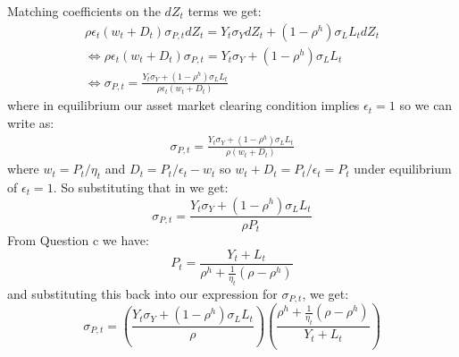 \documentclass{article}
\begin{document}
    Matching coefficients on the $dZ_t$ terms we get:
    \[
    \begin{aligned}
        \rho \epsilon_t (w_t + D_t) \sigma_{P, t} d Z_t = Y_t \sigma_Y d Z_t + (1 - \rho^h) \sigma_L L_t d Z_t\\
        \iff \rho \epsilon_t (w_t + D_t) \sigma_{P, t}  = Y_t \sigma_Y + (1 - \rho^h) \sigma_L L_t \\
        \iff \sigma_{P, t} = \frac{Y_t \sigma_Y + (1 - \rho^h) \sigma_L L_t}{\rho \epsilon_t (w_t + D_t)}
    \end{aligned}    
    \]
    where in equilibrium our asset market clearing condition implies $\epsilon_t = 1$ so we can write as:
    \[
        \begin{aligned}
            \sigma_{P, t} = \frac{Y_t \sigma_Y + (1 - \rho^h) \sigma_L L_t}{\rho (w_t + D_t)}%
        \end{aligned}   
    \]
    where $w_t = P_t/\eta_t$ and $D_t =    P_t/\epsilon_t - w_t $ so $w_t + D_t = P_t/\epsilon_t =P_t$ under equilibrium of $\epsilon_t = 1$. So substituting that in we get:
    \[
        \sigma_{P, t} = \frac{Y_t \sigma_Y + (1 - \rho^h) \sigma_L L_t}{\rho P_t}    
    \]
    From Question c we have:
    \[
        P_t = \frac{Y_{t} + L_t}{\rho^h + \frac{1}{\eta_t}(\rho-\rho^h)}
    \]
    and substituting this back into our expression for $\sigma_{P, t}$, we get:
    \[
        \boxed{\sigma_{P, t} = \left(\frac{Y_t \sigma_Y + (1 - \rho^h) \sigma_L L_t}{\rho}\right) \left(\frac{\rho^h + \frac{1}{\eta_t}(\rho-\rho^h)}{Y_{t} + L_t} \right)}
    \]

\end{document}
